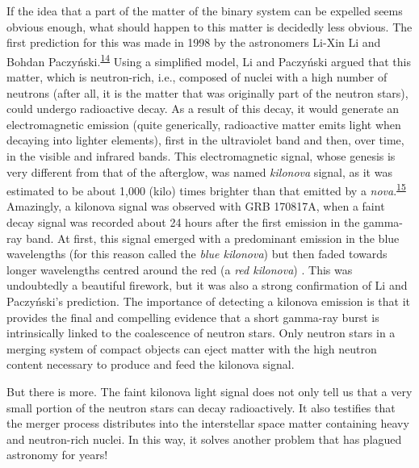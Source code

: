 If the idea that a part of the matter of the binary system can be expelled seems obvious
enough, what should happen to this matter is decidedly less obvious. The first
prediction for this was made in 1998 by the astronomers Li-Xin Li and
Bohdan Paczyński.\textsuperscript{\hyperlink{note:08-14}{14}} Using a simplified model, Li and
Paczyński argued that this matter, which is neutron-rich, i.e., composed of nuclei with
a high number of neutrons (after all, it is the matter that was originally part of the
neutron stars), could undergo radioactive decay. As a result of this decay, it would
generate an electromagnetic emission (quite generically, radioactive matter emits light
when decaying into lighter elements), first in the ultraviolet band and then, over time,
in the visible and infrared bands. This electromagnetic signal, whose genesis is very
different from that of the afterglow, was named
\emph{kilonova} signal, as it was estimated to be about 1,000 (kilo)
times brighter than that emitted by a \emph{nova}.\textsuperscript{\hyperlink{note:08-15}{15}}
Amazingly, a kilonova signal was observed with GRB 170817A, when a
faint decay signal was recorded about 24 hours after the first emission in the gamma-ray
band. At first, this signal emerged with a predominant emission in the blue wavelengths
(for this reason called the \emph{blue kilonova})  but then faded
towards longer wavelengths centred around the red (a \emph{red kilonova})
. This was undoubtedly a beautiful firework, but it was also a strong
confirmation of Li and Paczyński's prediction. The importance of detecting a kilonova
emission is that it provides the final and compelling evidence that a short gamma-ray
burst is intrinsically linked to the coalescence of neutron stars.
Only neutron stars in a merging system of compact objects can eject matter with the high
neutron content necessary to produce and feed the kilonova signal.

But there is more. The faint kilonova light signal does not only tell us that a very
small portion of the neutron stars can decay radioactively. It also testifies that the
merger process distributes into the interstellar space matter containing heavy and
neutron-rich nuclei. In this way, it solves another problem that has plagued astronomy
for years!

